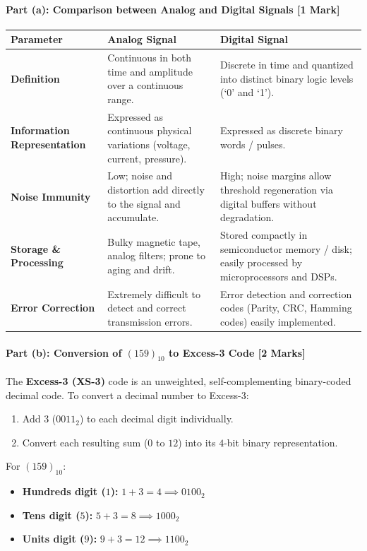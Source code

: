 \documentclass[11pt,a4paper,oneside]{book}
\begin{document}
\paragraph{Part (a): Comparison between Analog and Digital Signals [1 Mark]}
\begin{center}
\small
\begin{tabular}{@{}p{3.2cm}p{6.8cm}p{6.8cm}@{}}
\toprule
\textbf{Parameter} & \textbf{Analog Signal} & \textbf{Digital Signal} \\
\midrule
\textbf{Definition} & Continuous in both time and amplitude over a continuous range. & Discrete in time and quantized into distinct binary logic levels (`0' and `1'). \\
\textbf{Information Representation} & Expressed as continuous physical variations (voltage, current, pressure). & Expressed as discrete binary words / pulses. \\
\textbf{Noise Immunity} & Low; noise and distortion add directly to the signal and accumulate. & High; noise margins allow threshold regeneration via digital buffers without degradation. \\
\textbf{Storage \& Processing} & Bulky magnetic tape, analog filters; prone to aging and drift. & Stored compactly in semiconductor memory / disk; easily processed by microprocessors and DSPs. \\
\textbf{Error Correction} & Extremely difficult to detect and correct transmission errors. & Error detection and correction codes (Parity, CRC, Hamming codes) easily implemented. \\
\bottomrule
\end{tabular}
\end{center}

\paragraph{Part (b): Conversion of $(159)_{10}$ to Excess-3 Code [2 Marks]}
The \textbf{Excess-3 (XS-3)} code is an unweighted, self-complementing binary-coded decimal code. To convert a decimal number to Excess-3:
\begin{enumerate}
  \item Add $3$ ($0011_2$) to each decimal digit individually.
  \item Convert each resulting sum ($0$ to $12$) into its $4$-bit binary representation.
\end{enumerate}
For $(159)_{10}$:
\begin{itemize}
  \item \textbf{Hundreds digit ($1$):} $1 + 3 = 4 \implies 0100_2$
  \item \textbf{Tens digit ($5$):} $5 + 3 = 8 \implies 1000_2$
  \item \textbf{Units digit ($9$):} $9 + 3 = 12 \implies 1100_2$
\end{itemize}
\end{document}
